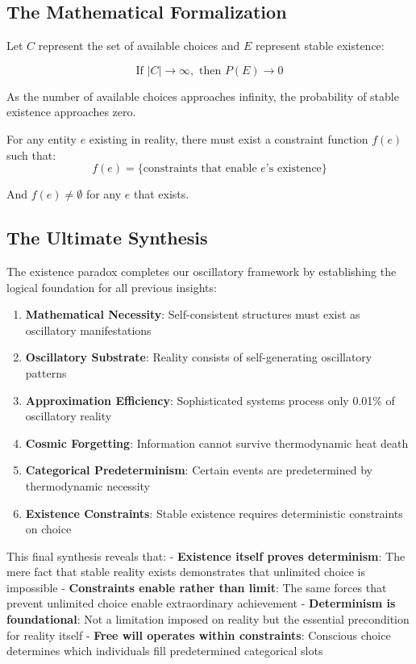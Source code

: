 \documentclass[11pt]{article}
\theoremstyle{remark}
\begin{document}
\subsection{The Mathematical Formalization}

Let $C$ represent the set of available choices and $E$ represent stable existence:

$$\text{If } |C| \to \infty, \text{ then } P(E) \to 0$$

As the number of available choices approaches infinity, the probability of stable existence approaches zero.

For any entity $e$ existing in reality, there must exist a constraint function $f(e)$ such that:
$$f(e) = \{\text{constraints that enable } e\text{'s existence}\}$$

And $f(e) \neq \emptyset$ for any $e$ that exists.

\subsection{The Ultimate Synthesis}

The existence paradox completes our oscillatory framework by establishing the logical foundation for all previous insights:

\begin{enumerate}
\item \textbf{Mathematical Necessity}: Self-consistent structures must exist as oscillatory manifestations
\item \textbf{Oscillatory Substrate}: Reality consists of self-generating oscillatory patterns
\item \textbf{Approximation Efficiency}: Sophisticated systems process only 0.01\% of oscillatory reality
\item \textbf{Cosmic Forgetting}: Information cannot survive thermodynamic heat death
\item \textbf{Categorical Predeterminism}: Certain events are predetermined by thermodynamic necessity
\item \textbf{Existence Constraints}: Stable existence requires deterministic constraints on choice
\end{enumerate}

This final synthesis reveals that:
- \textbf{Existence itself proves determinism}: The mere fact that stable reality exists demonstrates that unlimited choice is impossible
- \textbf{Constraints enable rather than limit}: The same forces that prevent unlimited choice enable extraordinary achievement
- \textbf{Determinism is foundational}: Not a limitation imposed on reality but the essential precondition for reality itself
- \textbf{Free will operates within constraints}: Conscious choice determines which individuals fill predetermined categorical slots
\end{document}
